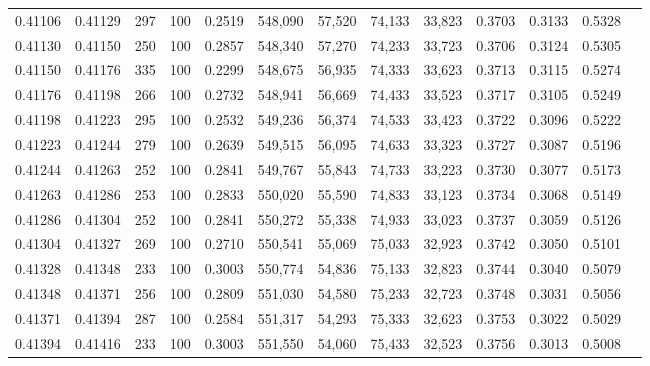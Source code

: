 \begin{tabular}{rrrrrrrrrrrrr}
0.41106 & 0.41129 &   297 & 100 &                                     0.2519 & 548,090 &  57,520 &  74,133 &  33,823 & 0.3703 & 0.3133 & 0.5328 \\
0.41130 & 0.41150 &   250 & 100 &                                     0.2857 & 548,340 &  57,270 &  74,233 &  33,723 & 0.3706 & 0.3124 & 0.5305 \\
0.41150 & 0.41176 &   335 & 100 &                                     0.2299 & 548,675 &  56,935 &  74,333 &  33,623 & 0.3713 & 0.3115 & 0.5274 \\
0.41176 & 0.41198 &   266 & 100 &                                     0.2732 & 548,941 &  56,669 &  74,433 &  33,523 & 0.3717 & 0.3105 & 0.5249 \\
0.41198 & 0.41223 &   295 & 100 &                                     0.2532 & 549,236 &  56,374 &  74,533 &  33,423 & 0.3722 & 0.3096 & 0.5222 \\
0.41223 & 0.41244 &   279 & 100 &                                     0.2639 & 549,515 &  56,095 &  74,633 &  33,323 & 0.3727 & 0.3087 & 0.5196 \\
0.41244 & 0.41263 &   252 & 100 &                                     0.2841 & 549,767 &  55,843 &  74,733 &  33,223 & 0.3730 & 0.3077 & 0.5173 \\
0.41263 & 0.41286 &   253 & 100 &                                     0.2833 & 550,020 &  55,590 &  74,833 &  33,123 & 0.3734 & 0.3068 & 0.5149 \\
0.41286 & 0.41304 &   252 & 100 &                                     0.2841 & 550,272 &  55,338 &  74,933 &  33,023 & 0.3737 & 0.3059 & 0.5126 \\
0.41304 & 0.41327 &   269 & 100 &                                     0.2710 & 550,541 &  55,069 &  75,033 &  32,923 & 0.3742 & 0.3050 & 0.5101 \\
0.41328 & 0.41348 &   233 & 100 &                                     0.3003 & 550,774 &  54,836 &  75,133 &  32,823 & 0.3744 & 0.3040 & 0.5079 \\
0.41348 & 0.41371 &   256 & 100 &                                     0.2809 & 551,030 &  54,580 &  75,233 &  32,723 & 0.3748 & 0.3031 & 0.5056 \\
0.41371 & 0.41394 &   287 & 100 &                                     0.2584 & 551,317 &  54,293 &  75,333 &  32,623 & 0.3753 & 0.3022 & 0.5029 \\
0.41394 & 0.41416 &   233 & 100 &                                     0.3003 & 551,550 &  54,060 &  75,433 &  32,523 & 0.3756 & 0.3013 & 0.5008 \\

\end{tabular}
